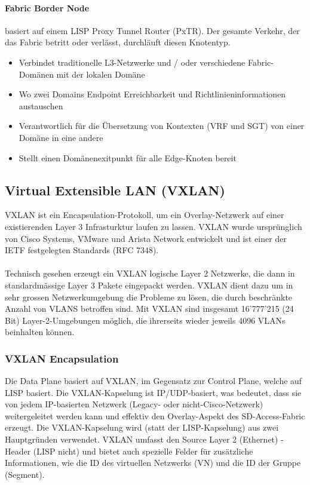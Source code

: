 \paragraph{Fabric Border Node} basiert auf einem LISP Proxy Tunnel Router (PxTR). Der gesamte Verkehr, der das Fabric betritt oder verlässt, durchläuft diesen Knotentyp.
\begin{itemize}
	\item Verbindet traditionelle L3-Netzwerke und / oder verschiedene Fabric-Domänen mit der lokalen Domäne
	\item Wo zwei Domains Endpoint Erreichbarkeit und Richtlinieninformationen austauschen
	\item Verantwortlich für die Übersetzung von Kontexten (VRF und SGT) von einer Domäne in eine andere
	\item Stellt einen Domänenexitpunkt für alle Edge-Knoten bereit
\end{itemize}

\subsection{Virtual Extensible LAN (VXLAN)}
VXLAN ist ein Encapsulation-Protokoll, um ein Overlay-Netzwerk auf einer existierenden Layer 3 Infrasturktur laufen zu lassen. VXLAN wurde ursprünglich von Cisco Systems, VMware und Arista Network entwickelt und ist einer der IETF festgelegten Standards (RFC 7348). \cite{rfc-7348} \\
\\
Technisch gesehen erzeugt ein VXLAN logische Layer 2 Netzwerke, die dann in standardmässige Layer 3 Pakete eingepackt werden. VXLAN dient dazu um in sehr grossen Netzwerkumgebung die Probleme zu lösen, die durch beschränkte Anzahl von VLANS betroffen sind. Mit VXLAN sind insgesamt 16’777’215 (24 Bit) Layer-2-Umgebungen möglich, die ihrerseits wieder jeweils 4096 VLANs beinhalten können. 

\subsubsection{VXLAN Encapsulation}
Die Data Plane basiert auf VXLAN, im Gegensatz zur Control Plane, welche auf LISP basiert. Die VXLAN-Kapselung ist IP/UDP-basiert, was bedeutet, dass sie von jedem IP-basierten Netzwerk (Legacy- oder nicht-Cisco-Netzwerk) weitergeleitet werden kann und effektiv den Overlay-Aspekt des SD-Access-Fabric erzeugt. Die VXLAN-Kapselung wird (statt der LISP-Kapselung) aus zwei Hauptgründen verwendet. VXLAN umfasst den Source Layer 2 (Ethernet) -Header (LISP nicht) und bietet auch spezielle Felder für zusätzliche Informationen, wie die ID des virtuellen Netzwerks (VN) und die ID der Gruppe (Segment). \cite{sda-whitepaper}\\

